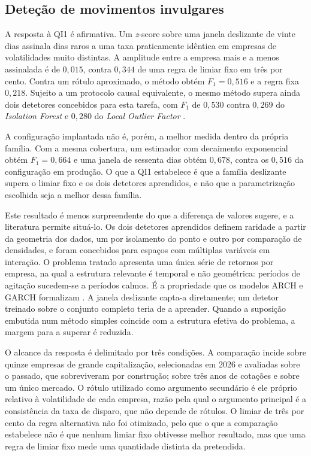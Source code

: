 \subsection{Deteção de movimentos invulgares}

A resposta à \gls{QI}1 é afirmativa. Um \emph{z}-score sobre uma janela deslizante de vinte dias assinala dias raros a uma taxa
praticamente idêntica em empresas de volatilidades muito distintas. A amplitude entre a empresa
mais e a menos assinalada é de $0{,}015$, contra $0{,}344$ de uma regra de limiar fixo em três por
cento. Contra um rótulo aproximado, o método obtém
$F_1 = 0{,}516$ e a regra fixa $0{,}218$. Sujeito a um protocolo causal equivalente, o mesmo método
supera ainda dois detetores concebidos para esta tarefa, com $F_1$ de $0{,}530$ contra $0{,}269$ do
\emph{Isolation Forest} \autocite{liu2008isolation} e $0{,}280$ do \emph{Local Outlier Factor}
\autocite{breunig2000lof}.

A configuração implantada não é, porém, a melhor medida dentro da própria família. Com a mesma
cobertura, um estimador com decaimento exponencial obtém $F_1 = 0{,}664$ e uma janela de sessenta
dias obtém $0{,}678$, contra os $0{,}516$ da configuração em produção. O que a \gls{QI}1 estabelece
é que a família deslizante supera o limiar fixo e os dois detetores aprendidos, e não que a
parametrização escolhida seja a melhor dessa família.

Este resultado é menos surpreendente do que a diferença de valores sugere, e a literatura permite
situá-lo. Os dois detetores aprendidos definem raridade a partir da geometria dos dados, um por
isolamento do ponto e outro por comparação de densidades, e foram concebidos para espaços com
múltiplas variáveis em interação. O problema tratado apresenta uma única série de retornos por empresa, na qual a estrutura
relevante é temporal e não geométrica: períodos de agitação sucedem-se a períodos calmos. É a
propriedade que os modelos \gls{ARCH} e \gls{GARCH} formalizam \autocite{engle1982arch,
bollerslev1986garch}. A janela deslizante capta-a diretamente; um detetor treinado sobre o
conjunto completo teria de a aprender. Quando a suposição embutida
num método simples coincide com a estrutura efetiva do problema, a margem para a superar é reduzida.

O alcance da resposta é delimitado por três condições. A comparação incide sobre quinze empresas de
grande capitalização, selecionadas em 2026 e avaliadas sobre o passado, que sobreviveram por
construção; sobre três anos de cotações e sobre um único mercado. O rótulo utilizado como argumento
secundário é ele próprio relativo à volatilidade de cada empresa, razão pela qual o argumento
principal é a consistência da taxa de disparo, que não depende de rótulos. O limiar de três por cento
da regra alternativa não foi otimizado, pelo que o que a comparação estabelece não é que nenhum
limiar fixo obtivesse melhor resultado, mas que uma regra de limiar fixo mede uma quantidade distinta
da pretendida.

